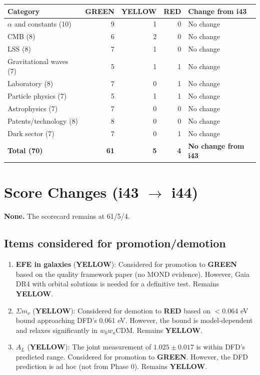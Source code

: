 \documentclass[11pt,a4paper]{article}
\newcommand{\GREEN}{\textcolor{dfdgreen}{\textbf{GREEN}}}
\newcommand{\YELLOW}{\textcolor{dfdyellow}{\textbf{YELLOW}}}
\newcommand{\RED}{\textcolor{dfdred}{\textbf{RED}}}
\begin{document}
\begin{center}
\begin{tabular}{lrrrl}
\toprule
\textbf{Category} & \textbf{\GREEN} & \textbf{\YELLOW} & \textbf{\RED} & \textbf{Change from i43} \\
\midrule
$\alpha$ and constants (10) & 9 & 1 & 0 & No change \\
CMB (8) & 6 & 2 & 0 & No change \\
LSS (8) & 7 & 1 & 0 & No change \\
Gravitational waves (7) & 5 & 1 & 1 & No change \\
Laboratory (8) & 7 & 0 & 1 & No change \\
Particle physics (7) & 5 & 1 & 1 & No change \\
Astrophysics (7) & 7 & 0 & 0 & No change \\
Patents/technology (8) & 8 & 0 & 0 & No change \\
Dark sector (7) & 7 & 0 & 1 & No change \\
\midrule
\textbf{Total (70)} & \textbf{61} & \textbf{5} & \textbf{4} & \textbf{No change from i43} \\
\bottomrule
\end{tabular}
\end{center}

\section{Score Changes (i43 $\to$ i44)}

\textbf{None.} The scorecard remains at 61/5/4.

\subsection{Items considered for promotion/demotion}

\begin{enumerate}
\item \textbf{EFE in galaxies} (\YELLOW): Considered for promotion to \GREEN{} based on the quality framework paper (no MOND evidence). However, Gaia DR4 with orbital solutions is needed for a definitive test. Remains \YELLOW.
\item \textbf{$\Sigma m_\nu$} (\YELLOW): Considered for demotion to \RED{} based on $< 0.064$ eV bound approaching DFD's 0.061 eV. However, the bound is model-dependent and relaxes significantly in $w_0 w_a$CDM. Remains \YELLOW.
\item \textbf{$A_L$} (\YELLOW): The joint measurement of $1.025 \pm 0.017$ is within DFD's predicted range. Considered for promotion to \GREEN. However, the DFD prediction is ad hoc (not from Phase 0). Remains \YELLOW.
\end{enumerate}
\end{document}
